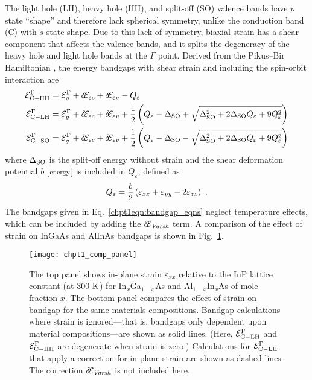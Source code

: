 \documentclass[12pt]{report}
\begin{document}
The light hole (LH), heavy hole (HH), and split-off (SO) valence bands have $p$ state ``shape'' and therefore lack spherical symmetry, unlike the conduction band (C) with $s$ state shape.  Due to this lack of symmetry, biaxial strain has a shear component that affects the valence bands, and it splits the degeneracy of the heavy hole and light hole bands at the $\Gamma$ point.  Derived from the Pikus--Bir Hamiltonian \cite{Pikus-Bir}, the energy bandgaps with shear strain and including the spin-orbit interaction are
\begin{subequations}
\begin{align}
\label{chpt1eqn:bandgap_eqns}
\EE_{\tn{C}-\tn{HH}}^\Gamma &= \EE_g^\Gamma+\delta\!\EE_{\varepsilon c}+\delta\!\EE_{\varepsilon v}-Q_\varepsilon\\
\EE_{\tn{C}-\tn{LH}}^\Gamma &= \EE_g^\Gamma+\delta\!\EE_{\varepsilon c}+\delta\!\EE_{\varepsilon v} + \frac{1}{2} \left(Q_\varepsilon-\Delta_{\tn{SO}}+\sqrt{\Delta_{\tn{SO}}^2+2 \Delta_{\tn{SO}} Q_\varepsilon +9 Q_\varepsilon^2}\right)\\
\EE_{\tn{C}-\tn{SO}}^\Gamma &= \EE_g^\Gamma+\delta\!\EE_{\varepsilon c}+\delta\!\EE_{\varepsilon v} + \frac{1}{2} \left(Q_\varepsilon-\Delta_{\tn{SO}}-\sqrt{\Delta_{\tn{SO}}^2+2 \Delta_{\tn{SO}} Q_\varepsilon +9 Q_\varepsilon^2}\right)
\end{align}
\end{subequations}
where $\Delta_{\textnormal{SO}}$ is the split-off energy without strain and the shear deformation potential $b$ [$\textnormal{\footnotesize{energy}}$] is included in $Q_\varepsilon$, defined as
\begin{equation}
Q_\varepsilon = \frac{b}{2} \left( \varepsilon_{xx}+\varepsilon_{yy}-2\varepsilon_{zz} \right) \textnormal{~.}
\end{equation}
The bandgaps given in Eq.~\eqref{chpt1eqn:bandgap_eqns} neglect temperature effects, which can be included by adding the $\delta\!\EE_\textit{Varsh}$ term.  A comparison of the effect of strain on InGaAs and AlInAs bandgaps is shown in Fig.~\ref{chpt1:strain_effect}.

\begin{figure}[tp]
\centering
\texttt{[image: chpt1\_comp\_panel]}
\caption[Bandgap strain dependence]{  The top panel shows in-plane strain $\varepsilon_{xx}$ relative to the InP lattice constant (at $300~\textnormal{K}$) for In$_x$Ga$_{1-x}$As and Al$_{1-x}$In$_{x}$As of mole fraction $x$.  The bottom panel compares the effect of strain on bandgap for the same materials compositions.  Bandgap calculations where strain is ignored---that is, bandgaps only dependent upon material compositions---are shown as solid lines.  (Here, $\EE_{\tn{C}-\tn{LH}}^\Gamma$ and $\EE_{\tn{C}-\tn{HH}}^\Gamma$ are degenerate when strain is zero.)  Calculations for $\EE_{\tn{C}-\tn{LH}}^\Gamma$ that apply a correction for in-plane strain are shown as dashed lines.  The correction $\delta\!\EE_\tn{\textit{Varsh}}$ is not included here.}
\label{chpt1:strain_effect}
\end{figure}
\end{document}
